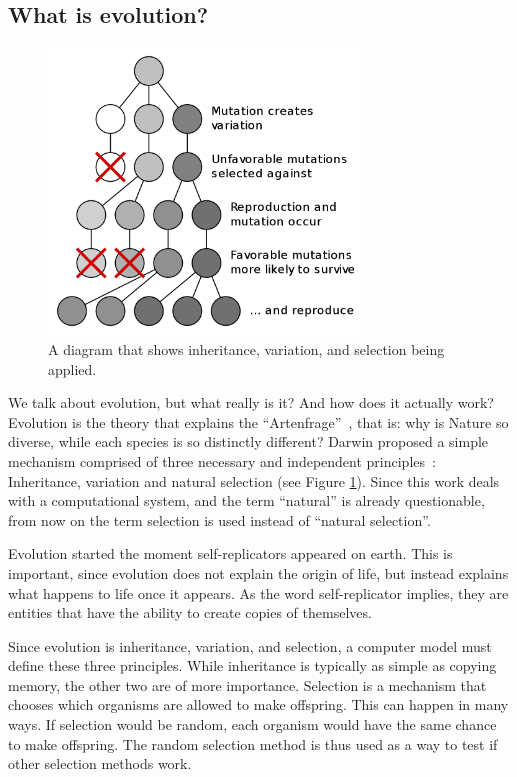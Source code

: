 \documentclass[12pt,oneside,listof=totoc,paper=a4,headings=small]{scrbook}
\begin{document}
\subsection{What is evolution?}
\begin{figure}[h!]
\centering
\includegraphics[width=0.75\textwidth,height=0.75\textheight,keepaspectratio]{images/1024px-Mutation_and_selection_diagram.png}
\caption{A diagram that shows inheritance, variation, and selection being applied.~\cite{evolDiagram}}
\label{fig:evolution}
\end{figure}
We talk about evolution, but what really is it?  And how does it actually work?
Evolution is the theory that explains the ``Artenfrage''~\cite{darwin2004origin}, that is: why is Nature so diverse, while each species is so distinctly different? Darwin proposed a simple mechanism comprised of three necessary and independent principles~\cite{huxley1942evolution}: Inheritance, variation and natural selection (see Figure \ref{fig:evolution}). 
Since this work deals with a computational system, and the term ``natural'' is already questionable, from now on the term selection is used instead of ``natural selection''.

Evolution started the moment self-replicators appeared on earth. This is important, since evolution does not explain the origin of life, but instead explains what happens to life once it appears. As the word self-replicator implies, they are entities that have the ability to create copies of themselves. 

Since evolution is inheritance, variation, and selection, a computer model must define these three principles. While inheritance is typically as simple as copying memory, the other two are of more importance. Selection is a mechanism that chooses which organisms are allowed to make offspring. This can happen in many ways. If selection would be random, each organism would have the same chance to make offspring. The random selection method is thus used as a way to test if other selection methods work.
\end{document}
